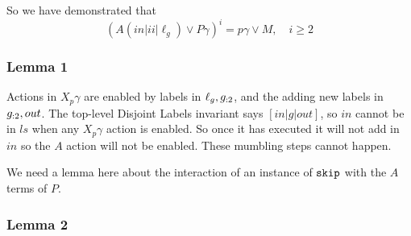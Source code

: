 So we have demonstrated that
\[
  (A(in|ii|\ell_g) \lor P\gamma)^i = p\gamma \lor M, \quad i \geq 2
\]

\subsubsection{Lemma 1}

Actions in $X_p\gamma$ are enabled by labels in $\ell_g,g_{:2}$,
and the adding new labels in $g_{:2},out$.
The top-level Disjoint Labels invariant says $[in|g|out]$,
so $in$ cannot be in $ls$ when any $X_p\gamma$ action is enabled.
So once it has executed it will not add in $in$ so the $A$ action
will not be enabled. These mumbling steps cannot happen.

We need a lemma here about the interaction of an instance of $\texttt{skip}$
with the $A$ terms of $P$.


\subsubsection{Lemma 2}

